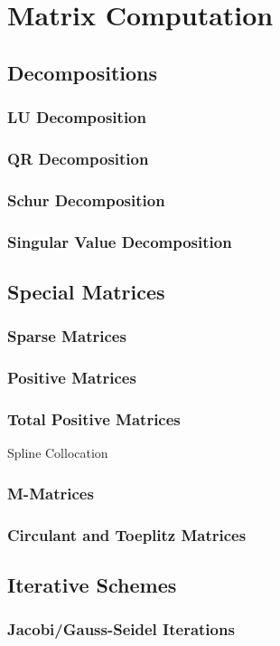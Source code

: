 \chapter{Matrix Computation}
\label{Ch: 8-Mat-Com}
\section{Decompositions}
\subsection{LU Decomposition}
\subsection{QR Decomposition}
\subsection{Schur Decomposition}
\subsection{Singular Value Decomposition}
\section{Special Matrices}
\subsection{Sparse Matrices}
\subsection{Positive Matrices}
\subsection{Total Positive Matrices}
Spline Collocation
\subsection{M-Matrices}
\subsection{Circulant and Toeplitz Matrices}

\section{Iterative Schemes}
\subsection{Jacobi/Gauss-Seidel Iterations}
